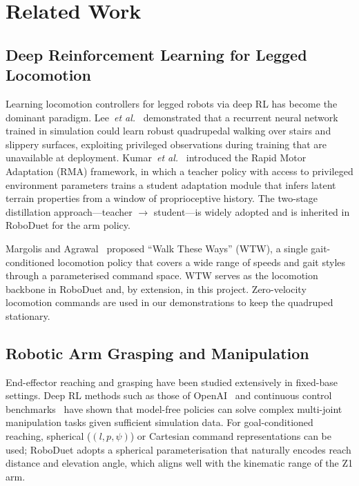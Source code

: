 
\chapter{Related Work}
\label{chp:related}

\section{Deep Reinforcement Learning for Legged Locomotion}

Learning locomotion controllers for legged robots via deep RL has become
the dominant paradigm.
Lee~\emph{et al.}~\cite{lee2020learning} demonstrated that a recurrent
neural network trained in simulation could learn robust quadrupedal walking
over stairs and slippery surfaces, exploiting privileged observations during
training that are unavailable at deployment.
Kumar~\emph{et al.}~\cite{kumar2021rma} introduced the Rapid Motor
Adaptation (RMA) framework, in which a teacher policy with access to
privileged environment parameters trains a student adaptation module that
infers latent terrain properties from a window of proprioceptive history.
The two-stage distillation approach---teacher $\rightarrow$ student---is
widely adopted and is inherited in RoboDuet for the arm policy.

Margolis and Agrawal~\cite{margolis2023walk} proposed ``Walk These Ways''
(WTW), a single gait-conditioned locomotion policy that covers a wide range
of speeds and gait styles through a parameterised command space.
WTW serves as the locomotion backbone in RoboDuet and, by extension, in this
project.  Zero-velocity locomotion commands are used in our demonstrations to
keep the quadruped stationary.

\section{Robotic Arm Grasping and Manipulation}

End-effector reaching and grasping have been studied extensively in
fixed-base settings.
Deep RL methods such as those of OpenAI~\cite{andrychowicz2020dexterous}
and continuous control benchmarks~\cite{tassa2018dmcontrol} have shown that
model-free policies can solve complex multi-joint manipulation tasks given
sufficient simulation data.
For goal-conditioned reaching, spherical ($(l, p, \psi)$) or Cartesian
command representations can be used; RoboDuet adopts a spherical
parameterisation that naturally encodes reach distance and elevation angle,
which aligns well with the kinematic range of the Z1 arm.

